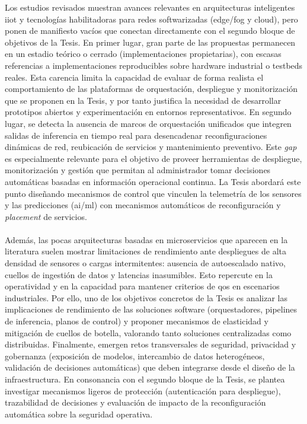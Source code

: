 Los estudios revisados muestran avances relevantes en arquitecturas inteligentes \gls{iiot} y tecnologías habilitadoras para redes softwarizadas (edge/fog y cloud), pero ponen de manifiesto vacíos que conectan directamente con el segundo bloque de objetivos de la Tesis. En primer lugar, gran parte de las propuestas permanecen en un estadio teórico o cerrado (implementaciones propietarias), con escasas referencias a implementaciones reproducibles sobre hardware industrial o testbeds reales. Esta carencia limita la capacidad de evaluar de forma realista el comportamiento de las plataformas de orquestación, despliegue y monitorización que se proponen en la Tesis, y por tanto justifica la necesidad de desarrollar prototipos abiertos y experimentación en entornos representativos. En segundo lugar, se detecta la ausencia de marcos de orquestación unificados que integren salidas de inferencia en tiempo real para desencadenar reconfiguraciones dinámicas de red, reubicación de servicios y mantenimiento preventivo. Este \textit{gap} es especialmente relevante para el objetivo de proveer herramientas de despliegue, monitorización y gestión que permitan al administrador tomar decisiones automáticas basadas en información operacional continua. La Tesis abordará este punto diseñando mecanismos de control que vinculen la telemetría  de los sensores y las predicciones (\gls{ai}/\gls{ml}) con mecanismos automáticos de reconfiguración y \textit{placement} de servicios.\\
\\
Además, las pocas arquitecturas basadas en microservicios que aparecen en la literatura suelen mostrar limitaciones de rendimiento ante despliegues de alta densidad de sensores o cargas intermitentes: ausencia de autoescalado nativo, cuellos de ingestión de datos y latencias inasumibles. Esto repercute en la operatividad y en la capacidad para mantener criterios de \gls{qos} en escenarios industriales. Por ello, uno de los objetivos concretos de la Tesis es analizar las implicaciones de rendimiento de las soluciones software (orquestadores, pipelines de inferencia, planos de control) y proponer mecanismos de elasticidad y mitigación de cuellos de botella, valorando tanto soluciones centralizadas como distribuidas. Finalmente, emergen retos transversales de seguridad, privacidad y gobernanza (exposición de modelos, intercambio de datos heterogéneos, validación de decisiones automáticas) que deben integrarse desde el diseño de la infraestructura. En consonancia con el segundo bloque de la Tesis, se plantea investigar mecanismos ligeros de protección (autenticación para despliegue), trazabilidad de decisiones y evaluación de impacto de la reconfiguración automática sobre la seguridad operativa.\\
